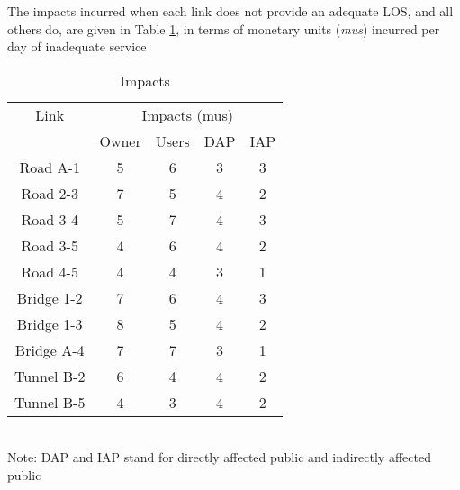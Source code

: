 The impacts incurred when each link does not provide an adequate LOS,
and all others do, are given in Table \ref{tblavaimain:12}, in terms of monetary units
(\textit{mus}) incurred per day of inadequate service

\begin{table}[h]
\caption{Impacts}
\begin{tabular}{|l|l|l|l|l|}
\hline
\multicolumn{1}{|c|}{Link} & \multicolumn{4}{c|}{Impacts (mus)} \\ 
\cline{2-5}
\multicolumn{1}{|c|}{} & \multicolumn{1}{c|}{Owner} & \multicolumn{1}{c|}{Users} & \multicolumn{1}{c|}{DAP} & \multicolumn{1}{c|}{IAP} \\ 
\hline
\multicolumn{1}{|c|}{Road A-1} & \multicolumn{1}{c|}{5} & \multicolumn{1}{c|}{6} & \multicolumn{1}{c|}{3} & \multicolumn{1}{c|}{3} \\ 
\hline
\multicolumn{1}{|c|}{Road 2-3} & \multicolumn{1}{c|}{7} & \multicolumn{1}{c|}{5} & \multicolumn{1}{c|}{4} & \multicolumn{1}{c|}{2} \\ 
\hline
\multicolumn{1}{|c|}{Road 3-4} & \multicolumn{1}{c|}{5} & \multicolumn{1}{c|}{7} & \multicolumn{1}{c|}{4} & \multicolumn{1}{c|}{3} \\ 
\hline
\multicolumn{1}{|c|}{Road 3-5} & \multicolumn{1}{c|}{4} & \multicolumn{1}{c|}{6} & \multicolumn{1}{c|}{4} & \multicolumn{1}{c|}{2} \\ 
\hline
\multicolumn{1}{|c|}{Road 4-5} & \multicolumn{1}{c|}{4} & \multicolumn{1}{c|}{4} & \multicolumn{1}{c|}{3} & \multicolumn{1}{c|}{1} \\ 
\hline
\multicolumn{1}{|c|}{Bridge 1-2} & \multicolumn{1}{c|}{7} & \multicolumn{1}{c|}{6} & \multicolumn{1}{c|}{4} & \multicolumn{1}{c|}{3} \\ 
\hline
\multicolumn{1}{|c|}{Bridge 1-3} & \multicolumn{1}{c|}{8} & \multicolumn{1}{c|}{5} & \multicolumn{1}{c|}{4} & \multicolumn{1}{c|}{2} \\ 
\hline
\multicolumn{1}{|c|}{Bridge A-4} & \multicolumn{1}{c|}{7} & \multicolumn{1}{c|}{7} & \multicolumn{1}{c|}{3} & \multicolumn{1}{c|}{1} \\ 
\hline
\multicolumn{1}{|c|}{Tunnel B-2} & \multicolumn{1}{c|}{6} & \multicolumn{1}{c|}{4} & \multicolumn{1}{c|}{4} & \multicolumn{1}{c|}{2} \\ 
\hline
\multicolumn{1}{|c|}{Tunnel B-5} & \multicolumn{1}{c|}{4} & \multicolumn{1}{c|}{3} & \multicolumn{1}{c|}{4} & \multicolumn{1}{c|}{2} \\ 
\hline
\end{tabular}\\
Note: DAP and IAP stand for directly affected public and indirectly
affected public
\label{tblavaimain:12}
\end{table}
